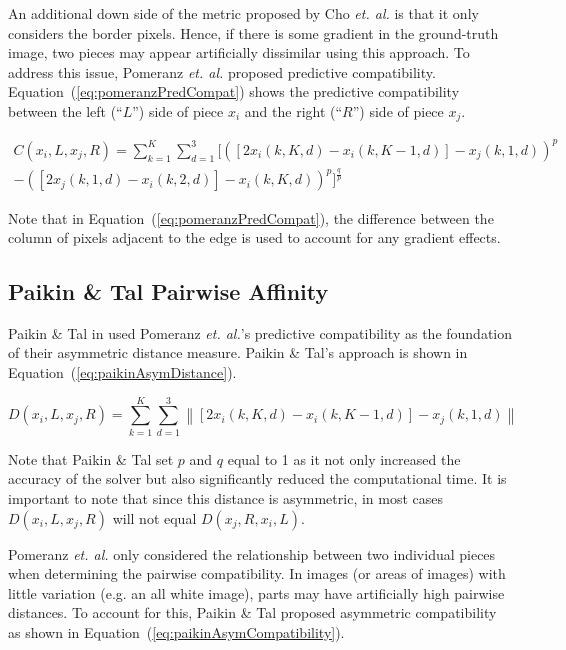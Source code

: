 \documentclass{report}
\def\eref#1{(\ref{#1})}
\newcommand{\norm}[1]{\left\lVert#1\right\rVert}
\begin{document}
An additional down side of the metric proposed by Cho \textit{et. al.} is that it only considers the border pixels.  Hence, if there is some gradient in the ground-truth image, two pieces may appear artificially dissimilar using this approach.  To address this issue, Pomeranz \textit{et. al.} proposed predictive compatibility.  Equation~\eref{eq:pomeranzPredCompat} shows the predictive compatibility between the left (``$L$'') side of piece $x_i$ and the right (``$R$'') side of piece $x_j$.  

\begin{equation} \label{eq:pomeranzPredCompat}
\begin{split}
C(x_i,L,x_j,R) = \sum_{k=1}^{K}\sum_{d=1}^{3}\Big[ ([2x_i(k, K, d) - x_i(k, K-1, d)] - x_j(k, 1, d))^p \\ - ([2x_j(k, 1, d) - x_i(k, 2, d)] - x_i(k, K, d))^p\Big]^{\frac{q}{p}}
\end{split}
\end{equation}

Note that in Equation~\eref{eq:pomeranzPredCompat}, the difference between the column of pixels adjacent to the edge is used to account for any gradient effects.

\subsection{Paikin \& Tal Pairwise Affinity}\label{sec:paikinPairwiseAffinity}

Paikin \& Tal in \cite{paikin2015} used Pomeranz \textit{et. al.}'s predictive compatibility as the foundation of their asymmetric distance measure.  Paikin \& Tal's approach is shown in Equation~\eref{eq:paikinAsymDistance}.

\begin{equation} \label{eq:paikinAsymDistance}
D(x_i,L,x_j,R) = \sum_{k=1}^{K}\sum_{d=1}^{3} \norm{[2x_i(k, K, d) - x_i(k, K-1, d)] - x_j(k, 1, d)}
\end{equation}

Note that Paikin \& Tal set $p$ and $q$ equal to 1 as it not only increased the accuracy of the solver but also significantly reduced the computational time.  It is important to note that since this distance is asymmetric, in most cases $D(x_i,L,x_j,R)$ will not equal $D(x_j,R,x_i,L)$.

Pomeranz \textit{et. al.} only considered the relationship between two individual pieces when determining the pairwise compatibility.  In images (or areas of images) with little variation (e.g. an all white image), parts may have artificially high pairwise distances.  To account for this, Paikin \& Tal proposed asymmetric compatibility as shown in Equation~\eref{eq:paikinAsymCompatibility}.
\end{document}
